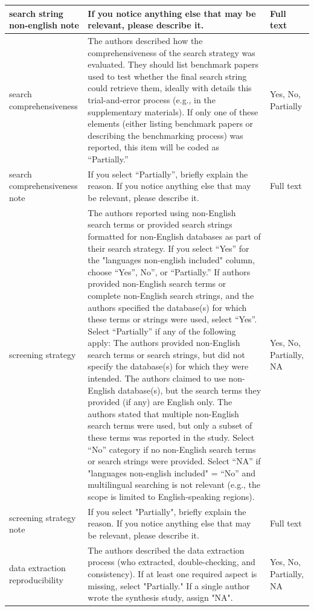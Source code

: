 \documentclass{article}
\begin{document}
\begin{longtable}{p{2cm}|p{5.7cm}|p{2.75cm}}
        \hline
        search string non-english note & If you notice anything else that may be relevant, please describe it. & Full text \\
        \hline
        search comprehensiveness & The authors described how the comprehensiveness of the search strategy was evaluated. They should list benchmark papers used to test whether the final search string could retrieve them, ideally with details this trial-and-error process (e.g., in the supplementary materials). If only one of these elements (either listing benchmark papers or describing the benchmarking process) was reported, this item will be coded as “Partially.” & Yes, No, Partially \\
        \hline
        search comprehensiveness note & If you select “Partially”, briefly explain the reason. If you notice anything else that may be relevant, please describe it. & Full text \\
        \hline
        screening strategy & The authors reported using non-English search terms or provided search strings formatted for non-English databases as part of their search strategy. If you select “Yes” for the "languages non-english included" column, choose “Yes”, No”, or “Partially.” If authors provided non-English search terms or complete non-English search strings, and the authors specified the database(s) for which these terms or strings were used, select “Yes”. Select “Partially” if any of the following apply: The authors provided non-English search terms or search strings, but did not specify the database(s) for which they were intended. The authors claimed to use non-English database(s), but the search terms they provided (if any) are English only. The authors stated that multiple non-English search terms were used, but only a subset of these terms was reported in the study. Select “No” category if no non-English search terms or search strings were provided. Select “NA” if "languages non-english included" = “No” and multilingual searching is not relevant (e.g., the scope is limited to English-speaking regions). & Yes, No, Partially, NA \\
        \hline
        screening strategy note & If you select "Partially", briefly explain the reason. If you notice anything else that may be relevant, please describe it. & Full text \\
        \hline
        data extraction reproducibility & The authors described the data extraction process (who extracted, double-checking, and consistency). If at least one required aspect is missing, select "Partially." If a single author wrote the synthesis study, assign "NA". & Yes, No, Partially, NA \\

\end{longtable}
\end{document}
